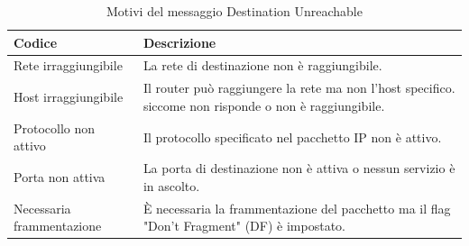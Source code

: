 \begin{center} 
\begin{longtable}{|p{}|p{}|} 
\caption{Motivi del messaggio Destination Unreachable} 
\label{tabella:caso:DestUnreach} \\
    \hline
    \textbf{Codice} & \textbf{Descrizione} \\
    \hline
    Rete irraggiungibile &  
    La rete di destinazione non è raggiungibile. %
    \\
    \hline 
    Host irraggiungibile &  
    Il router può raggiungere la rete ma non l'host specifico.
    siccome non risponde o non è raggiungibile. %
    \\
    \hline
    Protocollo non attivo & 
    Il protocollo specificato nel pacchetto IP non è attivo. %
    \\
    \hline
    Porta non attiva & 
    La porta di destinazione non è attiva o nessun servizio è in ascolto.  
    \\
    \hline 
    Necessaria frammentazione & 
    È necessaria la frammentazione del pacchetto %
    ma il flag "Don't Fragment" (DF) è impostato. %
    \\
    \hline  
\end{longtable} 
\end{center} 
